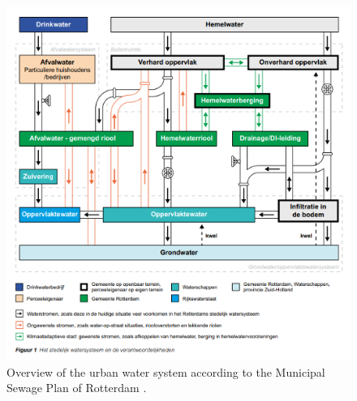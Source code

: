 \begin{figure}[htbp]
    \centering
    \includegraphics[width=0.75\linewidth]{figures/figures theory/rotterdam2020a.png}
    \caption{Overview of the urban water system according to the Municipal Sewage Plan of Rotterdam \cite{gemeente-rotterdam-2020A}.}
    \label{MSP}
\end{figure}

\\
